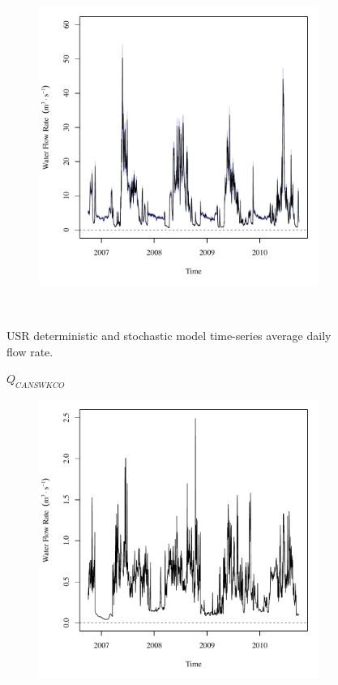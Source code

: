 \begin{linenumbers}
\begin{landscape}
\begin{figure}
\begin{subfigure}{0.7\textwidth}
			\includegraphics[width=\tableCustomSize]{"Figures/Results_USR/Stochastic/Q U201"}
		\end{subfigure}\\
		\caption{USR deterministic and stochastic model time-series average daily flow rate.}
	\end{figure}
\end{landscape}
\subfiguremid
\begin{landscape}
	\begin{figure}
		\centering
		$ Q_{CANSWKCO} $
		\begin{subfigure}{0.7\textwidth}
			\centering
			\includegraphics[width=\tableCustomSize]{"Figures/Results_USR/Deterministic/Q CAN"}

\end{subfigure}
\end{figure}
\end{landscape}
\end{linenumbers}
